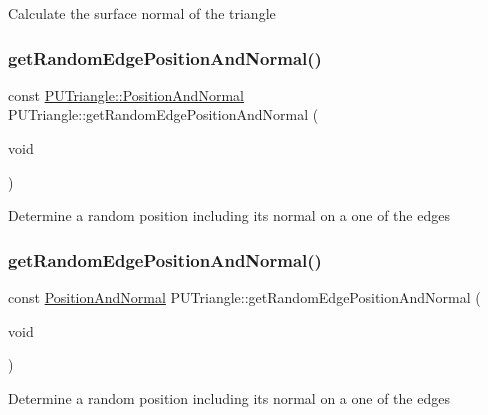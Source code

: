 Calculate the surface normal of the triangle \mbox{\label{classPUTriangle_a623e3c54b137ac249b9c3f1b1611eed7}} 
\subsubsection{\texorpdfstring{get\+Random\+Edge\+Position\+And\+Normal()}{getRandomEdgePositionAndNormal()}\hspace{0.1cm}{\footnotesize\ttfamily [1/2]}}
{\footnotesize\ttfamily const \hyperlink{structPUTriangle_1_1PositionAndNormal}{P\+U\+Triangle\+::\+Position\+And\+Normal} P\+U\+Triangle\+::get\+Random\+Edge\+Position\+And\+Normal (\begin{DoxyParamCaption}\item[{void}]{ }\end{DoxyParamCaption})}

Determine a random position including its normal on a one of the edges \mbox{\label{classPUTriangle_af9abade0c279f7eab45fc20ab3e9d9ee}} 
\subsubsection{\texorpdfstring{get\+Random\+Edge\+Position\+And\+Normal()}{getRandomEdgePositionAndNormal()}\hspace{0.1cm}{\footnotesize\ttfamily [2/2]}}
{\footnotesize\ttfamily const \hyperlink{structPUTriangle_1_1PositionAndNormal}{Position\+And\+Normal} P\+U\+Triangle\+::get\+Random\+Edge\+Position\+And\+Normal (\begin{DoxyParamCaption}\item[{void}]{ }\end{DoxyParamCaption})}

Determine a random position including its normal on a one of the edges \mbox{\label{classPUTriangle_a76d5ffffbe96de214ca5dd8b61d28055}} 
